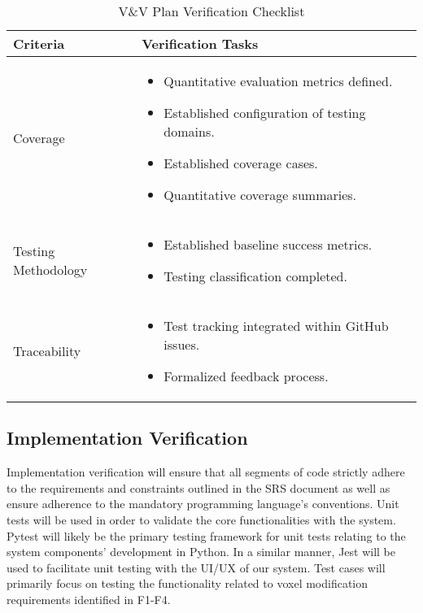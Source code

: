 \documentclass[12pt, titlepage]{article}
\begin{document}
\begin{table}[H]
\centering
\caption{V\&V Plan Verification Checklist}
\renewcommand{\arraystretch}{1.3}
\setlength{\tabcolsep}{8pt}
\begin{tabular}{|p{}|p{}|}
\hline
\textbf{Criteria} & \textbf{Verification Tasks} \\ \hline
Coverage &
\begin{itemize}
\item Quantitative evaluation metrics defined.
\item Established configuration of testing domains.
\item Established coverage cases.
\item Quantitative coverage summaries.
\end{itemize} \\ \hline
Testing Methodology &
\begin{itemize}
\item Established baseline success metrics.
\item Testing classification completed.
\end{itemize} \\ \hline
Traceability &
\begin{itemize}
\item Test tracking integrated within GitHub issues.
\item Formalized feedback process.
\end{itemize} \\ \hline
\end{tabular}
\end{table}


\subsection{Implementation Verification}

Implementation verification will ensure that all segments of code strictly adhere to the requirements and constraints outlined in the SRS document as well as ensure adherence to the mandatory programming language’s conventions. Unit tests will be used in order to validate the core functionalities with the system. Pytest will likely be the primary testing framework for unit tests relating to the system components' development in Python. In a similar manner, Jest will be used to facilitate unit testing with the UI/UX of our system. Test cases will primarily focus on testing the functionality related to voxel modification requirements identified in F1-F4.\\
\end{document}
